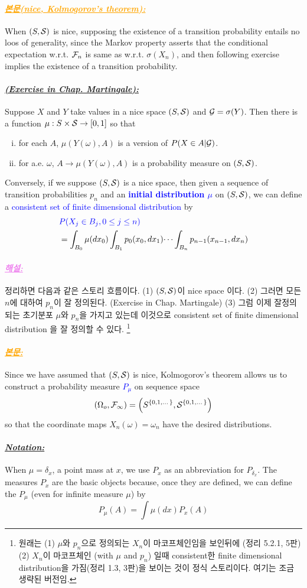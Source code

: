 \documentclass[12pt,oneside,english,a4paper]{article}
\newcommand{\para}[1]{\paragraph{\LARGE\it\underline{\textbf{#1:}}}\LARGE}
\newcommand{\paraviolet}[1]{\paragraph{\LARGE\textcolor{violet}{\it\underline{\textbf{#1:}}}}\LARGE}
\newcommand{\paraorange}[1]{\paragraph{\LARGE\textcolor{orange}{\it\underline{\textbf{#1:}}}}\LARGE}
\begin{document}
\paraorange{본문(nice, Kolmogorov's theorem)} When $(S,{\cal S})$ is nice, supposing the existence of a transition probability entails no loos of generality, since the Markov property asserts that the conditional expectation w.r.t. ${\cal F}_n$ is same as w.r.t. $\sigma(X_n)$, and then following exercise implies the existence of a transition probability.
\para{(Exercise in Chap. Martingale)} Suppose $X$ and $Y$ take values in a nice space $(S,{\cal S})$ and ${\cal G}=\sigma(Y)$. Then there is a function $\mu:S \times {\cal S} \to [0,1]$ so that 
\begin{enumerate}[(i)]
	\item for each $A$, $\mu(Y(\omega),A)$ is a version of $P(X\in A | {\cal G})$. 
	\item for a.e. $\omega$, $A \to \mu(Y(\omega),A)$ is a probability measure on $(S,{\cal S})$.
\end{enumerate}
Conversely, if we suppose $(S,{\cal S})$ is a nice space, then given a sequence of transition probabilities $p_n$ and an \textcolor{blue}{\bf initial distribution $\mu$} on $(S,{\cal S})$, we can define a \textcolor{blue}{consistent set of finite dimensional distribution} by 
\begin{align*}
& \textcolor{blue}{P(X_j\in B_j, 0\leq j\leq n)}\\ 
& =\int_{B_0}\mu(dx_0)\int_{B_1}p_0(x_0,dx_1)\dots\int_{B_n}p_{n-1}(x_{n-1},dx_n)
\end{align*}

\paraviolet{해설} 정리하면 다음과 같은 스토리 흐름이다. (1) $(S,{\cal S})$이 nice space 이다. (2) 그러면 모든 $n$에 대하여 $p_n$이 잘 정의된다. (Exercise in Chap. Martingale) (3) 그럼 이제 잘정의되는 초기분포 $\mu$와 $p_n$을 가지고 있는데 이것으로 consistent set of finite dimensional distribution 을 잘 정의할 수 있다. \footnote{원래는 (1) $\mu$와 $p_n$으로 정의되는 $X_n$이 마코프체인임을 보인뒤에 (정리 5.2.1, 5판) (2) $X_n$이 마코프체인 (with $\mu$ and $p_n$) 일때 consistent한 finite dimensional distribution을 가짐(정리 1.3, 3판)을 보이는 것이 정식 스토리이다. 여기는 조금 생략된 버전임.}

\paraorange{본문} Since we have assumed that $(S,{\cal S})$ is nice, Kolmogorov's theorem allows us to construct a probability measure \textcolor{blue}{$P_{\mu}$} on sequence space 
\[
(\Omega_o,{\cal F}_{\infty})=\Big(S^{\{0,1,\dots\}},{\cal S}^{\{0,1,\dots\}}\Big)
\] 
so that the coordinate maps $X_n(\omega)=\omega_n$ have the desired distributions. 

\para{Notation} When $\mu=\delta_x$, a point mass at $x$, we use $P_x$ as an abbreviation for $P_{\delta_x}$. The measures $P_x$ are the basic objects because, once they are defined, we can define the $P_{\mu}$ (even for infinite measure $\mu$) by 
\[
P_{\mu}(A)=\int \mu(dx)P_x(A)
\]
\end{document}
